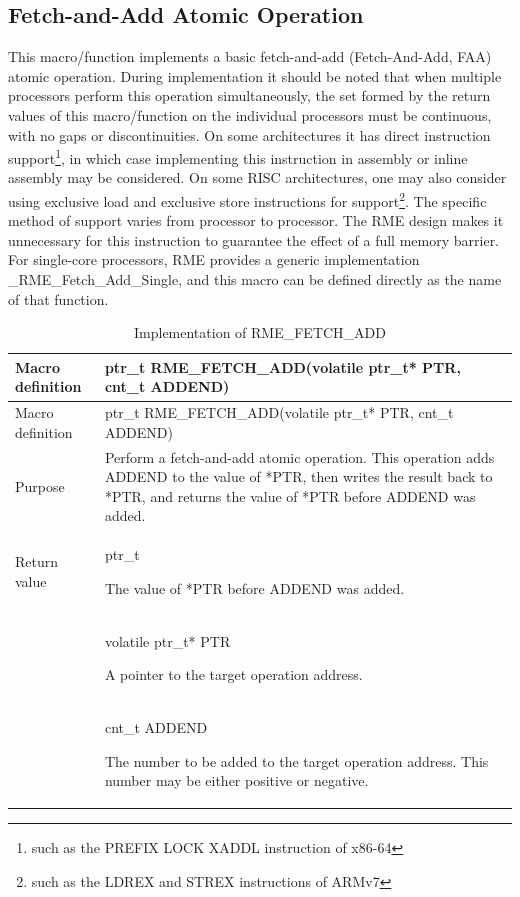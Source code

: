 \subsection{Fetch-and-Add Atomic Operation}\label{subsec:7-fetch-and-add-atomic-operation}

This macro/function implements a basic fetch-and-add (Fetch-And-Add, FAA) atomic operation. During implementation it should be noted that when multiple processors perform this operation simultaneously, the set formed by the return values of this macro/function on the individual processors must be continuous, with no gaps or discontinuities. On some architectures it has direct instruction support\footnote{such as the PREFIX LOCK XADDL instruction of x86-64}, in which case implementing this instruction in assembly or inline assembly may be considered. On some RISC architectures, one may also consider using exclusive load and exclusive store instructions for support\footnote{such as the LDREX and STREX instructions of ARMv7}. The specific method of support varies from processor to processor. The RME design makes it unnecessary for this instruction to guarantee the effect of a full memory barrier. For single-core processors, RME provides a generic implementation \_RME\_Fetch\_Add\_Single, and this macro can be defined directly as the name of that function.

\begin{xltabular}{\textwidth}{@{}>{\hsize\raggedright\arraybackslash}X>{\hsize\raggedright\arraybackslash}X@{}}
\caption{Implementation of RME\_FETCH\_ADD}\label{tab:7-32-rme-fetch-add-implementation}\\
\toprule
Macro definition & ptr\_t RME\_FETCH\_ADD(volatile ptr\_t* PTR, cnt\_t
ADDEND)\tabularnewline
\endfirsthead
\toprule
Macro definition & ptr\_t RME\_FETCH\_ADD(volatile ptr\_t* PTR, cnt\_t
ADDEND)\tabularnewline
\midrule
\endhead
\bottomrule
\endlastfoot
Purpose &
Perform a fetch-and-add atomic operation. This operation adds ADDEND to the value of *PTR, then writes the result back to *PTR, and returns the value of *PTR before ADDEND was added.\tabularnewline
Return value\strut
 & ptr\_t

The value of *PTR before ADDEND was added.\strut
\tabularnewline
{} & volatile ptr\_t* PTR

A pointer to the target operation address.\strut
\tabularnewline
\strut
 & cnt\_t ADDEND

The number to be added to the target operation address. This number may be either positive or negative.\strut
\tabularnewline
\end{xltabular}
\nopagebreak[4]

